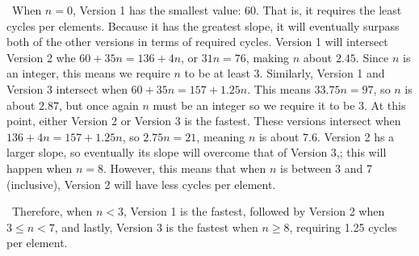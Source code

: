 \documentclass[12pt]{article}
\newenvironment{sol}[1][Solution]{\begin{trivlist}
		\item[\hskip \labelsep {\bfseries #1:}]}{\end{trivlist}}
\begin{document}
\begin{sol}
	\
	When $n=0$, Version 1 has the smallest value: 60. That is, it requires the least cycles
	per elements. Because it has the greatest slope, it will eventually surpass both
	of the other versions in terms of required cycles. Version 1 will intersect Version 2
	whe $60+35n=136+4n$, or $31n=76$, making $n$ about $2.45$. Since $n$ is an integer, this
	means we require $n$ to be at least 3. Similarly, Version 1 and Version 3 intersect when
	$60+35n=157+1.25n$. This means $33.75n=97$, so $n$ is about $2.87$, but once again
	$n$ must be an integer so we require it to be 3. At this point, either Version 2 or
	Version 3 is the fastest. These versions intersect when $136+4n=157+1.25n$, so
	$2.75n=21$, meaning $n$ is about $7.6$. Version 2 hs a larger slope, so eventually its
	slope will overcome that of Version 3,; this will happen when $n=8$. However, this means
	that when $n$ is between 3 and 7 (inclusive), Version 2 will have less cycles per element.
	
	\
	Therefore, when $n < 3$, Version 1 is the fastest, followed by Version 2 when 
	$3\leq n < 7$, and lastly, Version 3 is the fastest when $n\geq 8$, requiring 1.25 cycles
	per element.
\end{sol}
\end{document}
